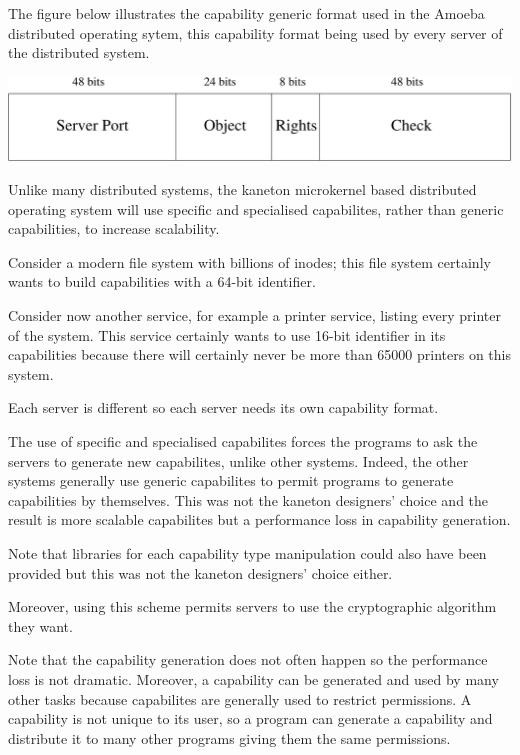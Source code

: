 \begin{multicols}{2}
The figure below illustrates the capability generic format used in the Amoeba
distributed operating sytem, this capability format being used by every
server of the distributed system.

\begin{center}
  \includegraphics[scale=0.35]{figures/capability.pdf}
\end{center}

Unlike many distributed systems, the kaneton microkernel based
distributed operating system will use specific and specialised capabilites,
rather than generic capabilities, to increase scalability.

Consider a modern file system with billions of inodes; this file system
certainly wants to build capabilities with a 64-bit identifier.

Consider now another service, for example a printer service, listing
every printer of the system. This service certainly wants to use 16-bit
identifier in its capabilities because there will certainly never be more
than 65000 printers on this system.

Each server is different so each server needs its own capability format.

The use of specific and specialised capabilites forces the programs to ask
the servers to generate new capabilites, unlike other systems. Indeed,
the other systems generally use generic capabilites to permit programs to
generate capabilities by themselves. This was not the kaneton designers'
choice and the result is more scalable capabilites but a performance loss
in capability generation.

Note that libraries for each capability type manipulation could also have
been provided but this was not the kaneton designers' choice either.

Moreover, using this scheme permits servers to use the cryptographic
algorithm they want.

Note that the capability generation does not often happen so the performance
loss is not dramatic. Moreover, a capability can be generated and used
by many other tasks because capabilites are generally used to restrict
permissions. A capability is not unique to its user, so a program can
generate a capability and distribute it to many other programs giving
them the same permissions.


\end{multicols}
